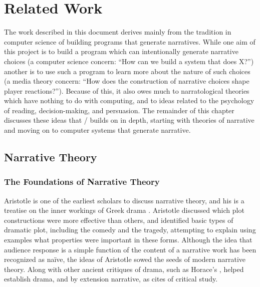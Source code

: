\chapter{Related Work}

\label{ch:related-work}

The work described in this document derives mainly from the tradition in computer science of building programs that generate narratives.
%
While one aim of this project is to build a program which can intentionally generate narrative choices (a computer science concern: ``How can we build a system that does X?'') another is to use such a program to learn more about the nature of such choices (a media theory concern: ``How does the construction of narrative choices shape player reactions?'').
%
Because of this, it also owes much to narratological theories which have nothing to do with computing, and to ideas related to the psychology of reading, decision-making, and persuasion.
%
The remainder of this chapter discusses these ideas that \dunyazad/ builds on in depth, starting with theories of narrative and moving on to computer systems that generate narrative.

\section{Narrative Theory}

\subsection{The Foundations of Narrative Theory}

Aristotle is one of the earliest scholars to discuss narrative theory, and his  is a treatise on the inner workings of Greek drama \citep{Aristotle1917}.
%
Aristotle discussed which plot constructions were more effective than others, and identified basic types of dramatic plot, including the comedy and the tragedy, attempting to explain using examples what properties were important in these forms.
%
Although the idea that audience response is a simple function of the content of a narrative work has been recognized as na\"ive, the ideas of Aristotle sowed the seeds of modern narrative theory.
%
Along with other ancient critiques of drama, such as Horace's  \citep{Horace1783},  helped establish drama, and by extension narrative, as cites of critical study.


